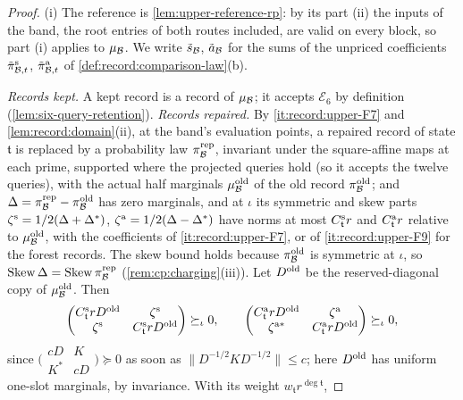 \begin{proof}
(i) The reference is \cref{lem:upper-reference-rp}: by its part (ii) the
inputs of the band, the root entries of both routes included, are valid on
every block, so part (i) applies to $\mu_\Blk$. We write $\tilde s_\Blk$,
$\tilde a_\Blk$ for the sums of the unpriced coefficients
$\tilde\pi^{\rm s}_{\Blk,t}$, $\tilde\pi^{\rm a}_{\Blk,t}$ of
\cref{def:record:comparison-law}(b).

\emph{Records kept.} A kept record is a record of $\mu_\Blk$; it accepts
$\mathcal E_6$ by definition (\cref{lem:six-query-retention}). \emph{Records
repaired.} By \ref{it:record:upper-F7} and \cref{lem:record:domain}(ii), at the
band's evaluation points, a repaired record of state $\mathfrak t$ is replaced by a
probability law $\pi^{\rm rep}_\Blk$, invariant under the square-affine maps at each
prime, supported where the projected queries hold (so it accepts the twelve
queries), with the actual half marginals $\mu^{\rm old}_\Blk$ of the old record
$\pi^{\rm old}_\Blk$; and $\Delta=\pi^{\rm rep}_\Blk-\pi^{\rm old}_\Blk$ has zero
marginals, and at $\iota$ its symmetric and skew parts
$\zeta^{\rm s}=\frac12(\Delta+\Delta^*)$, $\zeta^{\rm a}=\frac12(\Delta-\Delta^*)$ have
norms at most $C^{\rm s}_{\mathfrak t}r$ and $C^{\rm a}_{\mathfrak t}r$ relative to
$\mu^{\rm old}_\Blk$, with the coefficients of \ref{it:record:upper-F7}, or of
\ref{it:record:upper-F9} for the forest records. The skew bound holds because
$\pi^{\rm old}_\Blk$ is symmetric at $\iota$, so
$\operatorname{Skew}\Delta=\operatorname{Skew}\pi^{\rm rep}_\Blk$
(\cref{rem:cp:charging}(iii)). Let $D^{\rm old}$ be the reserved-diagonal copy of
$\mu^{\rm old}_\Blk$. Then
\[
 \begin{pmatrix}C^{\rm s}_{\mathfrak t}rD^{\rm old}&\zeta^{\rm s}\\ \zeta^{\rm s}&C^{\rm s}_{\mathfrak t}rD^{\rm old}
 \end{pmatrix}\succeq_\iota0,\qquad
 \begin{pmatrix}C^{\rm a}_{\mathfrak t}rD^{\rm old}&\zeta^{\rm a}\\ \zeta^{\rm a*}&C^{\rm a}_{\mathfrak t}rD^{\rm old}
 \end{pmatrix}\succeq_\iota0,
\]
since $\bigl(\begin{smallmatrix}cD&K\\K^*&cD\end{smallmatrix}\bigr)\succeq0$ as
soon as $\|D^{-1/2}KD^{-1/2}\|\le c$; here $D^{\rm old}$ has uniform one-slot
marginals, by invariance. With its weight $w_{\mathfrak t}r^{\deg\mathfrak t}$,

\end{proof}
